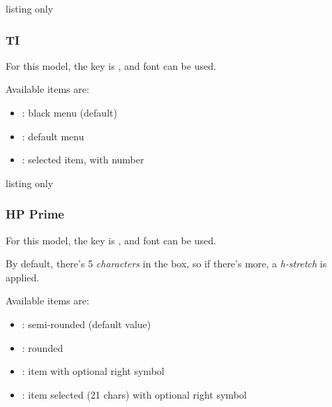 \documentclass[11pt,a4paper]{ltxdoc}
\begin{document}
\begin{DemoCode}{listing only}
\end{DemoCode}

\subsubsection{TI}

For this model, the key is \ShowCode{[model=ti]}, and font \ShowCode{[font=\\fontTI]} can be used.

Available items are:

\begin{itemize}[leftmargin=*]
	\item \ShowCode{[type=\{\}]}: black menu (default)\hfill{}
	\item \ShowCode{[type=menu]}: default menu\hfill{}
	\item \ShowCode{[type=itemsel]}: selected item, with number\hfill{}
\end{itemize}

\begin{DemoCode}{listing only}
\end{DemoCode}

\subsubsection{HP Prime}

For this model, the key is \ShowCode{[model=hp]}, and font \ShowCode{[font=\\fontHP]} can be used.

By default, there's 5 \textit{characters} in the box, so if there's more, a \textit{h-stretch} is applied.

Available items are:

\begin{itemize}[leftmargin=*]
	\item \ShowCode{[type=\{\}]}: semi-rounded (default value) \hfill{}
	\item \ShowCode{[type=ritem]}: rounded \hfill{}
	\item \ShowCode{[type=item]}: item with optional right symbol\hfill{}
	\item \ShowCode{[type=itemsel]}: item selected (21 chars) with optional right symbol
	
	\hfill{}
\end{itemize}
\end{document}
